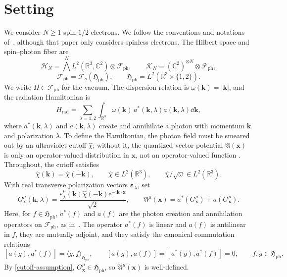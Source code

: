 \documentclass[final,reqno]{amsart}
\theoremstyle{remark}
\newcommand{\RR}{\mathbb{R}}
\newcommand{\CC}{\mathbb{C}}
\renewcommand{\i}{\mathrm{i}}
\newcommand{\e}{\mathrm{e}}
\newcommand{\dua}[2]{\langle #1, #2 \rangle}
\newcommand{\ol}[1]{\overline{#1}}
\newcommand{\HC}{\mathcal{H}}
\newcommand{\AF}{\bm{\mathfrak{A}}}
\newcommand{\Af}{\mathfrak{A}}
\newcommand{\ph}{\mathrm{ph}}
\newcommand{\rad}{\mathrm{rad}}
\newcommand{\Fock}{\mathcal{F}}
\newcommand{\Hil}{\mathfrak{H}}
\newcommand{\vepsilon}{{\bm{\epsilon}}}
\newcommand{\vk}{\mathbf{k}}
\newcommand{\vx}{\mathbf{x}}
\newcommand{\wh}[1]{\widehat{#1}}
\renewcommand{\epsilon}{\varepsilon}
\begin{document}
\section{Setting}\label{sec-setting}

We consider $N\geq1$ spin-$1/2$ electrons.
We follow the conventions and notations of~\cite{Q},
although that paper only considers spinless electrons.
The Hilbert space and spin--photon fiber are
\[
 \HC_N=\bigwedge^N L^2(\RR^3,\CC^2)\otimes\Fock_\ph,
 \qquad \mathcal K_N=(\CC^2)^{\otimes N}\otimes\Fock_\ph,
\]
\[
 \Fock_\ph=\Fock_s(\Hil_\ph),\qquad
 \Hil_\ph=L^2(\RR^3\times\{1,2\}).
\]
We write $\Omega\in\Fock_\ph$ for the vacuum.  The dispersion relation
is $\omega(\vk)=|\vk|$, and the radiation Hamiltonian is
\[
 H_\rad=\sum_{\lambda=1,2}\int_{\RR^3}\omega(\vk)\,
        a^*(\vk,\lambda)a(\vk,\lambda)\dd\vk,
\]
where $a^*(\vk,\lambda)$ and $a(\vk,\lambda)$ create and annihilate
a photon with momentum $\vk$ and polarization $\lambda$.
To define the Hamiltonian, the photon field must be smeared out by an
ultraviolet cutoff $\wh\chi$; without it, the quantized vector
potential $\AF(\vx)$ is only an operator-valued distribution in $\vx$, not an
operator-valued function \cite{lieb2010stability}.  Throughout, the cutoff satisfies
\begin{equation}\label{cutoff-assumption}
 \wh\chi(\vk)=\ol{\wh\chi(-\vk)},\qquad
 \wh\chi\in L^2(\RR^3),\qquad
 \wh\chi/\sqrt\omega\in L^2(\RR^3).
\end{equation}
With real transverse polarization vectors $\vepsilon_\lambda$, set
\begin{equation}\label{Gx-def}
 G^\mu_\vx(\vk,\lambda)
 =\frac{\epsilon_\lambda^\mu(\vk)\wh\chi(-\vk)
                  \e^{-\i\vk\cdot\vx}}{\sqrt2},\qquad
 \Af^\mu(\vx)=a^*(G^\mu_\vx)+a(G^\mu_\vx).
\end{equation}
Here, for $f\in\Hil_\ph$, $a^*(f)$ and $a(f)$ are the photon
creation and annihilation operators on $\Fock_\ph$, as in~\cite{Q}.
The operator $a^*(f)$ is linear and $a(f)$ is antilinear in $f$, they are
mutually adjoint, and they satisfy the canonical commutation relations
\[
 [a(g),a^*(f)]=\dua{g}{f}_{\Hil_\ph},\qquad
 [a(g),a(f)]=[a^*(g),a^*(f)]=0,
 \qquad f,g\in\Hil_\ph.
\]
By \cref{cutoff-assumption}, $G^\mu_\vx\in\Hil_\ph$, so $\Af^\mu(\vx)$
is well-defined.
\end{document}
